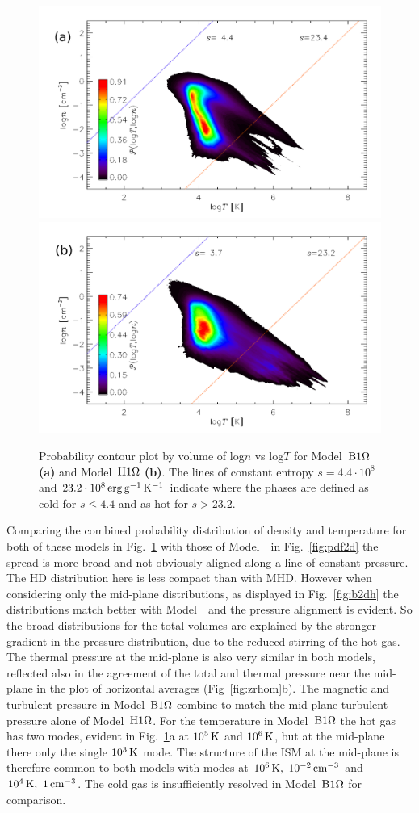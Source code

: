 \documentclass[useAMS,usenatbib]{mn2e}
\begin{document}
  \begin{figure}
  \centering
  \includegraphics[width=0.475\linewidth]{fig/o1pr_pdf2dtn.png}  
  \includegraphics[width=0.475\linewidth]{fig/o1ph_pdf2dtn.png}
    \caption[2D probability distribution of $n$ and $T$ for Models~$\Ompa$ and $\Omph$]{
  Probability contour plot by volume of log$n$ vs log$T$ for Model~$\Ompa$
  {\textbf{(a)}}
  and Model~$\Omph$ {\textbf{(b)}}.
  The lines of constant entropy $s=4.4\cdot10^{8}$ 
  and $23.2\cdot10^{8}\,{\rm erg}\,{\rm g}^{-1}\,{\rm K}^{-1}$ indicate where the phases are defined
  as cold for $s\le4.4$ and as hot for $s>23.2$. 
  \label{fig:b2dv}
    }
  \end{figure}

  Comparing the combined probability distribution of density and temperature
  for both of these models in Fig.~\ref{fig:b2dv} with those of Model~\Op\
  in Fig.~\ref{fig:pdf2d} the spread is more broad and not obviously 
  aligned along a line of constant pressure.
  The HD distribution here is less compact than with MHD. 
  However when considering only the mid-plane distributions, as displayed in
  Fig.~\ref{fig:b2dh} the distributions match better with Model~\Op\ and the 
  pressure alignment is evident.
  So the broad distributions for the total volumes are explained by the 
  stronger gradient in the pressure distribution, due to the reduced 
  stirring of the hot gas.
  The thermal pressure at the mid-plane is also very similar in both models,
  reflected also in the agreement of the total and thermal pressure near the
  mid-plane in the plot of horizontal averages (Fig~\ref{fig:zrhom}b).
  The magnetic and turbulent pressure in Model~$\Ompa$ combine to match the
  mid-plane turbulent pressure alone of Model~$\Omph$.
  For the temperature in Model~$\Ompa$ the hot gas has two modes, evident in 
  Fig.~\ref{fig:b2dv}a at $10^5\,{\rm K}$ and $10^6\,{\rm K}$, but at the mid-plane there 
  only the single $10^3\,{\rm K}$ mode. 
  The structure of the ISM at the mid-plane is therefore common to both models
  with modes at $10^6\,{\rm K},~10^{-2}\,{\rm cm^{-3}}$ and $10^4\,{\rm K},~1\,{\rm cm^{-3}}$.
  The cold gas is insufficiently resolved in Model~$\Ompa$ for comparison. 
  
\end{document}
